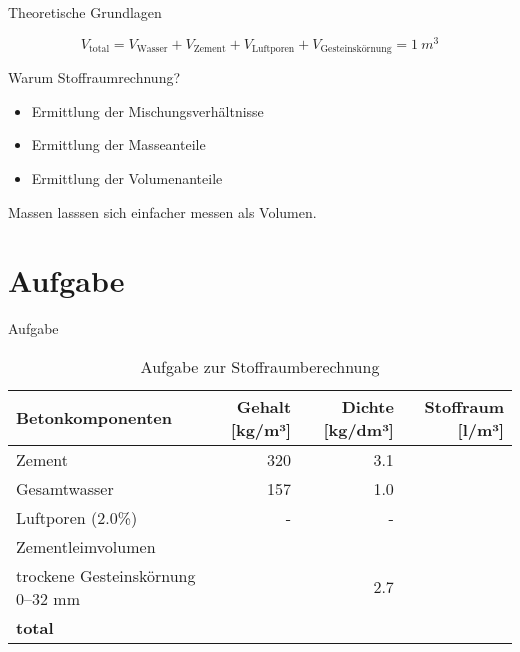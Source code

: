 \begin{frame}{Theoretische Grundlagen}

    \begin{equation*}
        V_\text{total} = V_{\text{Wasser}} + V_{\text{Zement}} + V_{\text{Luftporen}} + V_{\text{Gesteinskörnung}} = \SI{1}{m^3}
    \end{equation*}

\end{frame}

\begin{frame}{Warum Stoffraumrechnung?}
    \begin{itemize}
        \item Ermittlung der Mischungsverhältnisse
        \item Ermittlung der Masseanteile
        \item Ermittlung der Volumenanteile
    \end{itemize}
    \pause
    \vspace{1cm}
    Massen lasssen sich einfacher messen als Volumen.

\end{frame}







\section{Aufgabe}
\BlueSectionSlide

\begin{frame}{Aufgabe}
    \begin{table}[h]
        \centering
        \caption{Aufgabe zur Stoffraumberechnung}
        \small
        \begin{tabular}{lrrr}
        \toprule
        \textbf{Betonkomponenten}       & \textbf{Gehalt [kg/m³]} & \textbf{Dichte [kg/dm³]} & \textbf{Stoffraum [l/m³]} \\ 
        \midrule
        Zement                           & 320                      & 3.1                       &    {}          \\
        Gesamtwasser                     & 157                      & 1.0                       & {}            \\
        Luftporen (2.0\%)                & -                        & -                         & {}              \\
        Zementleimvolumen                &                          &                           &                           \\
        trockene Gesteinskörnung 0–32 mm & {}                     & 2.7                       & {}             \\
        \textbf{total}                   & {}           &                           & {}             \\
        \bottomrule
        \end{tabular}
        \label{tab:Stoffraumberechnung}
        \end{table}

\end{frame}

